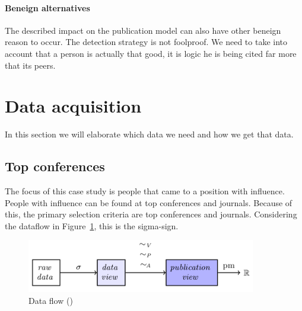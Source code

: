 \documentclass{ou-report}
\newcommand{\todo}[1]{{\color{red} TODO: #1}}
\begin{document}

\paragraph{Beneign alternatives}
The described impact on the publication model can also have other beneign reason 
to occur. The detection strategy is not foolproof. We need to take into account 
that a person is actually that good, it is logic he is being cited far more that 
its peers.



\section{Data acquisition}
In this section we will elaborate which data we need and how we get that data.

\subsection{Top conferences}
The focus of this case study is people that came to a position with influence.
People with influence can be found at top conferences and journals.
Because of this, the primary selection criteria are top conferences and journals.
Considering the dataflow in Figure~\ref{fig:dataflow_jm2017_2}, this is the 
sigma-sign.

\begin{figure}[H]
    \centering
    \includegraphics[width=10cm]{images/data_to_publication_metrics_jm2017.png}
    \caption{Data flow (\cite{JM2017})}
    \label{fig:dataflow_jm2017_2}
\end{figure}
\end{document}
